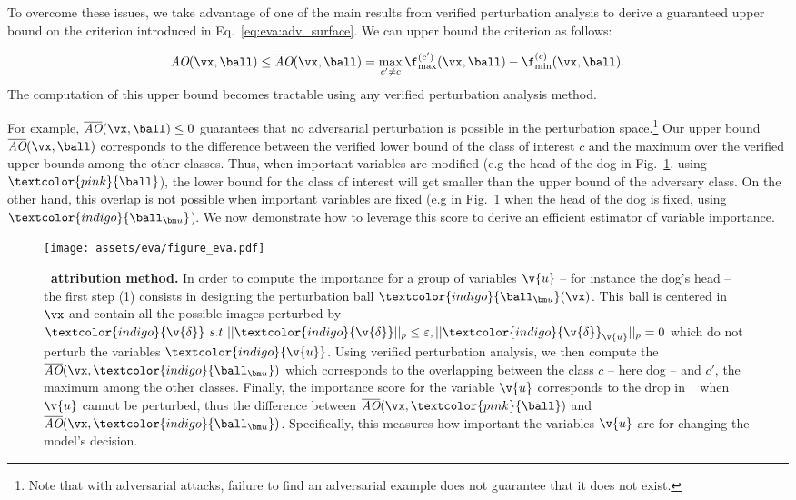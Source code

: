 To overcome these issues, we take advantage of one of the main results from verified perturbation analysis to derive a guaranteed upper bound on the criterion introduced in Eq.~\ref{eq:eva:adv_surface}. 
We can upper bound the \adv{} criterion as follows: 

$$ 
\AO(\vx, \ball) \leq \AOup(\vx, \ball) = \max\limits_{c'\neq c} \upperf^{(c')}(\vx, \ball) - \lowerf^{(c)}(\vx, \ball). 
$$
The computation of this upper bound becomes tractable using any verified perturbation analysis method. 


For example, $\AOup(\vx, \ball) \leq 0$  guarantees that no adversarial perturbation is possible in the perturbation space.\footnote{Note that with adversarial attacks, failure to find an adversarial example does not guarantee that it does not exist.}
Our upper bound $\AOup(\vx, \ball)$ corresponds to the difference between the verified lower bound of the class of interest $c$ and the maximum over the verified upper bounds among the other classes.
Thus, when important variables are modified (e.g the head of the dog in Fig.~\ref{fig:eva:method}, using $ \textcolor{pink}{\ball} $), the lower bound for the class of interest will get smaller than the upper bound of the adversary class. On the other hand, this overlap is not possible when important variables are fixed (e.g in Fig.~\ref{fig:eva:method} when the head of the dog is fixed, using $ \textcolor{indigo}{\ballu} $).
We now demonstrate how to leverage this score to derive an efficient estimator of variable importance.


\begin{figure*}[t!]
  \texttt{[image: assets/eva/figure\_eva.pdf]}
  \caption{
  \textbf{\eva~attribution method.} In order to compute the importance for a group of variables $\v{u}$ -- for instance the dog's head -- the first step (1) consists in designing the perturbation ball $\textcolor{indigo}{\ballu}(\vx)$. This ball is centered in $\vx$ and contain all the possible images perturbed by $\textcolor{indigo}{\v{\delta}} ~s.t~ ||\textcolor{indigo}{\v{\delta}}||_{p} \leq \varepsilon, ||\textcolor{indigo}{\v{\delta}}_{\v{u}}||_p = 0$ which do not perturb the variables $\textcolor{indigo}{\v{u}}$. Using verified perturbation analysis, we then compute the \adv~ $\AOup(\vx, \textcolor{indigo}{\ballu})$ which corresponds to the overlapping between the class $c$ -- here dog -- and $c'$, the maximum among the other classes. Finally, the importance score for the variable $\v{u}$ corresponds to the drop in \adv~ when $\v{u}$ cannot be perturbed, thus the difference between $\AOup(\vx, \textcolor{pink}{\ball})$ and $\AOup(\vx, \textcolor{indigo}{\ballu})$. 
  Specifically, this measures how important the variables $\v{u}$ are for changing the model's decision.
  }
  \label{fig:eva:method}
\end{figure*}

